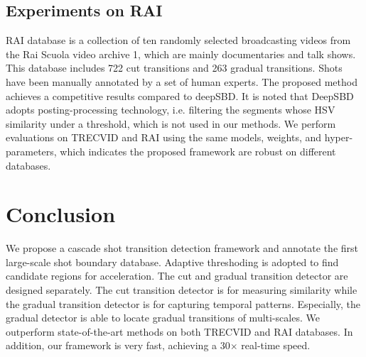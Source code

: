 \documentclass[runningheads]{llncs}
\begin{document}
\subsection{Experiments on RAI}
RAI database is a collection of ten randomly selected broadcasting videos from the Rai Scuola video archive 1, which are mainly documentaries and talk shows. This database includes 722 cut transitions and 263 gradual transitions. Shots have been manually annotated by a set of human experts. The proposed method achieves a competitive results compared to deepSBD. It is noted that DeepSBD adopts posting-processing technology, i.e. filtering the segments whose HSV similarity under a threshold, which is not used in our methods. We perform evaluations on TRECVID and RAI using the same models, weights, and hyper-parameters, which indicates the proposed framework are robust on different databases.

\section{Conclusion}
We propose a cascade shot transition detection framework and annotate the first large-scale shot boundary database. Adaptive threshoding is adopted to find candidate regions for acceleration. The cut and gradual transition detector are designed separately. The cut transition detector is for measuring similarity while the gradual transition detector is for capturing temporal patterns. Especially, the gradual detector is able to locate gradual transitions of multi-scales. We outperform state-of-the-art methods on both TRECVID and RAI databases. In addition, our framework is very fast, achieving a 30\(\times\) real-time speed.



\end{document}
